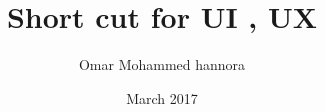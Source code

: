 \documentclass[a4paper,12pt]{book}
\begin{document}
\author{Omar Mohammed hannora}
\title{Short cut for UI , UX}
\date{March 2017}

\frontmatter
\maketitle
\tableofcontents

\mainmatter



\backmatter
\end{document}
